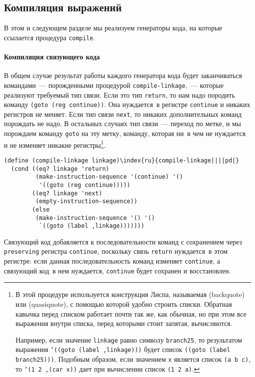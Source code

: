 \subsection{Компиляция выражений}
\label{COMPILING-EXPRESSIONS}


В этом и следующем разделе мы реализуем генераторы кода, на
которые ссылается процедура {\tt compile}.

\paragraph{Компиляция связующего кода}


В общем случае результат работы каждого генератора кода
будет заканчиваться командами~--- порожденными процедурой
{\tt compile-linkage},~--- которые реализуют требуемый тип
связи.  Если это тип {\tt return}, то нам надо породить команду
{\tt (goto (reg continue))}.  Она нуждается~в регистре
{\tt continue} и никаких регистров не меняет.  Если тип связи
{\tt next}, то никаких дополнительных команд порождать не
надо.  В остальных случаях тип связи~--- переход по метке, и мы
порождаем команду {\tt goto} на эту метку, команду, которая ни~в чем не
нуждается и не изменяет никакие регистры\footnote{ 
В этой процедуре используется конструкция Лиспа,
называемая  (backquote) или
 (quasiquote), с помощью которой
удобно строить списки.  Обратная кавычка перед списком
работает почти так же, как обычная, но при этом все выражения внутри
списка, перед которыми стоит запятая, вычисляются.
%
%

Например, если значение {\tt linkage} равно
символу {\tt branch25}, то результатом выражения {\tt `((goto (label
,linkage)))} будет список {\tt ((goto (label
branch25)))}.  Подобным образом, если значением {\tt x}
является список {\tt (a b c)}, то {\tt `(1 2 ,(car x))}
дает при вычислении список {\tt (1 2 a)}.
}.

\begin{Verbatim}[fontsize=\small]
(define (compile-linkage linkage)\index{ru}{compile-linkage||||pd|}
  (cond ((eq? linkage 'return)
         (make-instruction-sequence '(continue) '()
          '((goto (reg continue)))))
        ((eq? linkage 'next)
         (empty-instruction-sequence))
        (else
         (make-instruction-sequence '() '()
          `((goto (label ,linkage)))))))
\end{Verbatim}
Связующий код добавляется к последовательности команд с сохранением
через {\tt preserving} регистра {\tt continue},
поскольку связь {\tt return} нуждается~в этом регистре: если
данная последовательность команд изменяет {\tt continue}, а
связующий код~в нем нуждается, {\tt continue} будет сохранен и
восстановлен.

